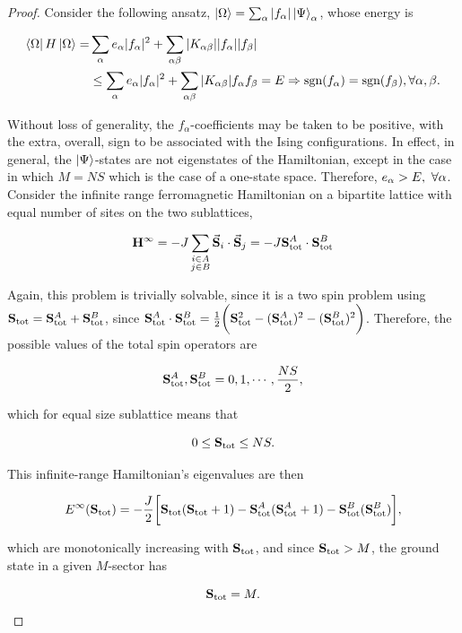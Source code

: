 \documentclass{homework}
\begin{document}
\begin{proof}
Consider the following ansatz, $\ket{\Omega} = \sum_{\alpha} |f_{\alpha}| \ket{\Psi}_{\alpha}$, whose energy is 

\begin{equation}
\begin{split}
    \bra{\Omega} H \ket{\Omega} = & \sum_{\alpha} e_{\alpha} |f_{\alpha}|^2 + \sum_{\alpha \beta} |K_{\alpha \beta}| |f_{\alpha}| |f_{\beta}| \\
    & \leq \sum_{\alpha} e_{\alpha} |f_{\alpha}|^2 + \sum_{\alpha \beta} |K_{\alpha \beta}| f_{\alpha} f_{\beta} = E \Rightarrow \textnormal{sgn}(f_{\alpha}) = \textnormal{sgn}(f_{\beta}), \forall \alpha, \beta. 
\end{split}
\end{equation}

Without loss of generality, the $f_{\alpha}$-coefficients may be taken to be positive, with the extra, overall, sign to be associated with the Ising configurations. In effect, in general, the $\ket{{\Psi}}$-states are not  eigenstates of the Hamiltonian, except in the case in which $M = NS$ which is the case of a one-state space. Therefore, $e_{\alpha} > E, \textnormal{ } \forall \alpha$.
Consider the infinite range ferromagnetic Hamiltonian on a bipartite lattice with equal number of sites on the two sublattices, 

$$
    {\bf H}^{\infty} = -J \sum_{\substack{
    i \in A \\
    j \in B}} \vec{{\bf S}}_i \cdot \vec{{\bf S}}_j = -J {\bf S}_{\textnormal{tot}}^A \cdot {\bf S}_{\textnormal{tot}}^B
$$

Again, this problem is trivially solvable, since it is a two spin problem using ${\bf S}_{\textnormal{tot}} = {\bf S}_{\textnormal{tot}}^A + {\bf S}_{\textnormal{tot}}^B$, since ${\bf S}_{\textnormal{tot}}^A \cdot {\bf S}_{\textnormal{tot}}^B = \frac{1}{2} \bigg( {\bf S}_{\textnormal{tot}}^2 - ({\bf S}_{\textnormal{tot}}^A)^2 - ({\bf S}_{\textnormal{tot}}^B)^2 \bigg)$.
Therefore, the possible values of the total spin operators are 

$$
    {\bf S}_{\textnormal{tot}}^A, {\bf S}_{\textnormal{tot}}^B = 0, 1, \cdots, \frac{NS}{2},
$$

which for equal size sublattice means that 

\begin{equation}
    0 \leq {\bf S}_{\textnormal{tot}} \leq NS.
    \label{infinite_range_HH_total_spin}
\end{equation}

This infinite-range Hamiltonian's eigenvalues are then 

\begin{equation}
    E^{\infty} ({\bf S}_{\textnormal{tot}}) = -\frac{J}{2} \bigg[{\bf S}_{\textnormal{tot}}({\bf S}_{\textnormal{tot}} + 1) - {\bf S}_{\textnormal{tot}}^A({\bf S}_{\textnormal{tot}}^A+1) - {\bf S}_{\textnormal{tot}}^B({\bf S}_{\textnormal{tot}}^B)\bigg],
\end{equation}

which are monotonically increasing with ${\bf S}_{\textnormal{tot}}$, and since ${\bf S}_{\textnormal{tot}} > M$, the ground state in a given $M$-sector has 

$$
{\bf S}_{\textnormal{tot}} = M.
$$
\end{proof}
\end{document}
